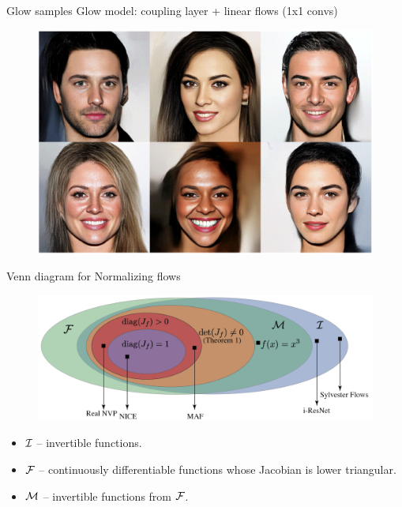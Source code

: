 \begin{frame}{Glow samples}
	Glow model: coupling layer + linear flows (1x1 convs)
	\begin{figure}
		\centering
		\includegraphics[width=0.9\linewidth]{figs/glow_faces.png}
	\end{figure}
\end{frame}
\begin{frame}{Venn diagram for Normalizing flows}
	
	\begin{figure}
		\centering
		\includegraphics[width=\linewidth]{figs/venn_diagram}
	\end{figure}
	\begin{itemize}
		\item $\mathcal{I}$ -- invertible functions.
		\item $\mathcal{F}$ -- continuously differentiable functions whose Jacobian is lower triangular.
		\item $\mathcal{M}$ -- invertible functions from $\mathcal{F}$.
	\end{itemize}
\end{frame}
